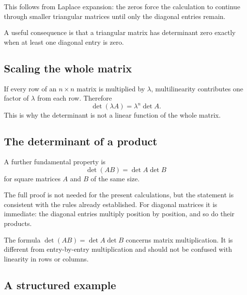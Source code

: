 This follows from Laplace expansion: the zeros force the calculation to continue through smaller triangular matrices until only the diagonal entries remain.

A useful consequence is that a triangular matrix has determinant zero exactly when at least one diagonal entry is zero.

\subsection{Scaling the whole matrix}

If every row of an \(n\times n\) matrix is multiplied by \(\lambda\), multilinearity contributes one factor of \(\lambda\) from each row. Therefore
\[
\det(\lambda A)=\lambda^n\det A.
\]
This is why the determinant is not a linear function of the whole matrix.

\subsection{The determinant of a product}

A further fundamental property is
\[
\det(AB)=\det A\det B
\]
for square matrices \(A\) and \(B\) of the same size.

The full proof is not needed for the present calculations, but the statement is consistent with the rules already established. For diagonal matrices it is immediate: the diagonal entries multiply position by position, and so do their products.

\begin{remarkbox}
The formula \(\det(AB)=\det A\det B\) concerns matrix multiplication. It is different from entry-by-entry multiplication and should not be confused with linearity in rows or columns.
\end{remarkbox}

\subsection{A structured example}

